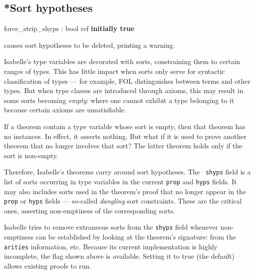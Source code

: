 \subsection{*Sort hypotheses} 
\begin{ttbox} 
force_strip_shyps : bool ref \hfill{\bf initially true}
\end{ttbox}

\begin{ttdescription}
\item[\ttindexbold{force_strip_shyps}]
causes sort hypotheses to be deleted, printing a warning.
\end{ttdescription}

Isabelle's type variables are decorated with sorts, constraining them to
certain ranges of types.  This has little impact when sorts only serve for
syntactic classification of types --- for example, FOL distinguishes between
terms and other types.  But when type classes are introduced through axioms,
this may result in some sorts becoming {\em empty\/}: where one cannot exhibit
a type belonging to it because certain axioms are unsatisfiable.

If a theorem contain a type variable whose sort is empty, then that theorem
has no instances.  In effect, it asserts nothing.  But what if it is used to
prove another theorem that no longer involves that sort?  The latter theorem
holds only if the sort is non-empty.

Therefore, Isabelle's theorems carry around sort hypotheses. The {\tt
shyps} field is a list of sorts occurring in type variables in the current
{\tt prop} and {\tt hyps} fields.  It may also includes sorts used in the
theorem's proof that no longer appear in the {\tt prop} or {\tt hyps}
fields --- so-called {\em dangling\/} sort constraints. These are the
critical ones, asserting non-emptiness of the corresponding sorts.
 
Isabelle tries to remove extraneous sorts from the {\tt shyps} field whenever
non-emptiness can be established by looking at the theorem's signature: from
the {\tt arities} information, etc.  Because its current implementation is
highly incomplete, the flag shown above is available.  Setting it to true (the
default) allows existing proofs to run.


